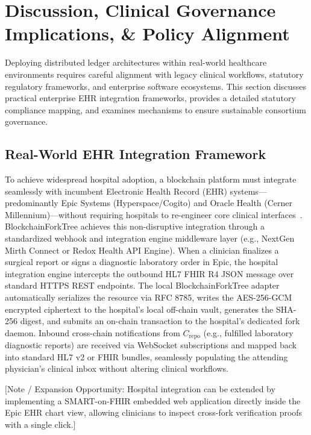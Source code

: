 \section{Discussion, Clinical Governance Implications, \& Policy Alignment}
\label{sec:discussion_policy}

Deploying distributed ledger architectures within real-world healthcare environments requires careful alignment with legacy clinical workflows, statutory regulatory frameworks, and enterprise software ecosystems. This section discusses practical enterprise EHR integration frameworks, provides a detailed statutory compliance mapping, and examines mechanisms to ensure sustainable consortium governance.

\subsection{Real-World EHR Integration Framework}
To achieve widespread hospital adoption, a blockchain platform must integrate seamlessly with incumbent Electronic Health Record (EHR) systems—predominantly Epic Systems (Hyperspace/Cogito) and Oracle Health (Cerner Millennium)—without requiring hospitals to re-engineer core clinical interfaces~\cite{mcinnes2020hl7, vogel2021interoperability}. BlockchainForkTree achieves this non-disruptive integration through a standardized webhook and integration engine middleware layer (e.g., NextGen Mirth Connect or Redox Health API Engine). When a clinician finalizes a surgical report or signs a diagnostic laboratory order in Epic, the hospital integration engine intercepts the outbound HL7 FHIR R4 JSON message over standard HTTPS REST endpoints. The local BlockchainForkTree adapter automatically serializes the resource via RFC 8785, writes the AES-256-GCM encrypted ciphertext to the hospital's local off-chain vault, generates the SHA-256 digest, and submits an on-chain transaction to the hospital's dedicated fork daemon. Inbound cross-chain notifications from $C_{\text{repo}}$ (e.g., fulfilled laboratory diagnostic reports) are received via WebSocket subscriptions and mapped back into standard HL7 v2 or FHIR bundles, seamlessly populating the attending physician's clinical inbox without altering clinical workflows.

[Note / Expansion Opportunity: Hospital integration can be extended by implementing a SMART-on-FHIR embedded web application directly inside the Epic EHR chart view, allowing clinicians to inspect cross-fork verification proofs with a single click.]

